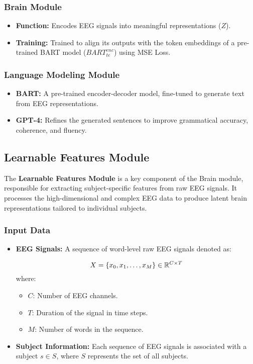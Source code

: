 \documentclass[journal]{IEEEtran}
\begin{document}
\subsubsection{Brain Module}
\begin{itemize}
	\item \textbf{Function:} Encodes EEG signals into meaningful representations (\(Z\)).
	\item \textbf{Training:} Trained to align its outputs with the token embeddings of a pre-trained BART model (\(BART_{te}^{enc}\)) using MSE Loss.
\end{itemize}

\subsubsection{Language Modeling Module}
\begin{itemize}
	\item \textbf{BART:} A pre-trained encoder-decoder model, fine-tuned to generate text from EEG representations.
	\item \textbf{GPT-4:} Refines the generated sentences to improve grammatical accuracy, coherence, and fluency.
\end{itemize}

\subsection{Learnable Features Module}

The \textbf{Learnable Features Module} is a key component of the Brain module, responsible for extracting subject-specific features from raw EEG signals. It processes the high-dimensional and complex EEG data to produce latent brain representations tailored to individual subjects.

\subsubsection{Input Data}
\begin{itemize}
	\item \textbf{EEG Signals:} A sequence of word-level raw EEG signals denoted as:
	      
	      \begin{equation}
	      	\\X = \{x_0, x_1, \dots, x_M\} \in \mathbb{R}^{C \times T}
	      \end{equation}
	      where:
	      \begin{itemize}
	      	\item \( C \): Number of EEG channels.
	      	\item \( T \): Duration of the signal in time steps.
	      	\item \( M \): Number of words in the sequence.
	      \end{itemize}
	\item \textbf{Subject Information:} Each sequence of EEG signals is associated with a subject \( s \in S \), where \( S \) represents the set of all subjects.
\end{itemize}
\end{document}
